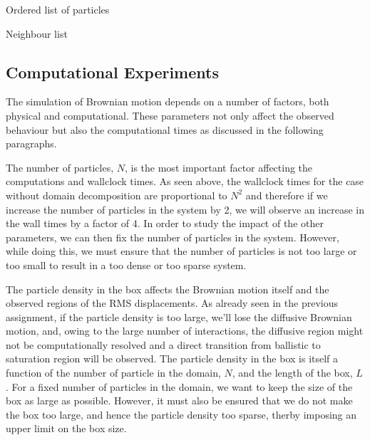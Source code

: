 \documentclass[11pt, oneside]{article}
\begin{document}
\begin{algorithm}
  \DontPrintSemicolon
  \caption{Ordered list of particles}
\end{algorithm}

\begin{algorithm}
  \DontPrintSemicolon
  \caption{Neighbour list}
\end{algorithm}

\subsection{Computational Experiments}
The simulation of Brownian motion depends on a number of factors, both physical and computational. These parameters not only affect the observed behaviour but also the computational times as discussed in the following paragraphs.

The number of particles, $N$, is the most important factor affecting the computations and wallclock times. As seen above, the wallclock times for the case without domain decomposition are proportional to $N^2$ and therefore if we increase the number of particles in the system by 2, we will observe an increase in the wall times by a factor of 4. In order to study the impact of the other parameters, we can then fix the number of particles in the system. However, while doing this, we must ensure that the number of particles is not too large or too small to result in a too dense or too sparse system.

The particle density in the box affects the Brownian motion itself and the  observed regions of the RMS displacements. As already seen in the previous assignment, if the particle density is too large, we'll lose the diffusive Brownian motion, and, owing to the large number of interactions, the diffusive region might not be computationally resolved and a direct transition from ballistic to saturation region will be observed. The particle density in the box is itself a function of the number of particle in the domain, $N$, and the length of the box, $L$. For a fixed number of particles in the domain, we want to keep the size of the box as large as possible. However, it must also be ensured that we do not make the box too large, and hence the particle density too sparse, therby imposing an upper limit on the box size.
\end{document}
